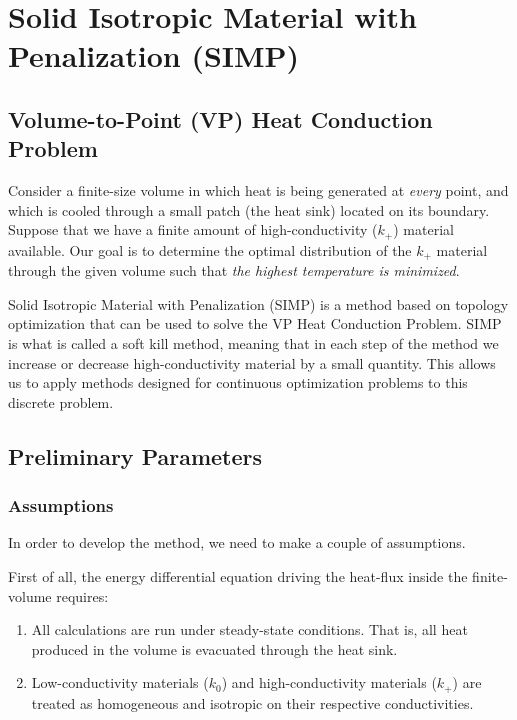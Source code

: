 \section{Solid Isotropic Material with Penalization (SIMP)}

\subsection*{Volume-to-Point (VP) Heat Conduction Problem}

Consider a finite-size volume in which heat is being generated at \textit{every} point, and which is cooled through a small patch (the heat sink) located on its boundary. Suppose that we have a finite amount of high-conductivity ($k_+$) material available. Our goal is to determine the optimal distribution of the $k_+$ material through the given volume such that \textit{the highest temperature is minimized}.

Solid Isotropic Material with Penalization (SIMP) is a method based on topology optimization that can be used to solve the VP Heat Conduction Problem. SIMP is what is called a soft kill method, meaning that in each step of the method we increase or decrease high-conductivity material by a small quantity. This allows us to apply methods designed for continuous optimization problems to this discrete problem.

\subsection{Preliminary Parameters}

\subsubsection*{Assumptions}
In order to develop the method, we need to make a couple of assumptions.

First of all, the energy differential equation driving the heat-flux inside the finite-volume requires:
\begin{enumerate}
	\item All calculations are run under steady-state conditions. That is, all heat produced in the volume is evacuated through the heat sink.
	\item Low-conductivity materials ($k_0$) and high-conductivity materials ($k_+$) are treated as homogeneous and isotropic on their respective conductivities.
\end{enumerate}

